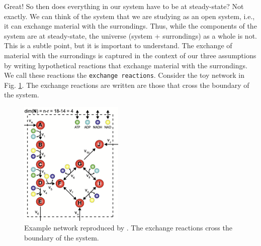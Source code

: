 \documentclass{article}[11pt]
\begin{document}
Great! So then does everything in our system have to be at steady-state? Not exactly. 
We can think of the system that we are studying as an open system, i.e., it can exchange material with the 
surrondings. Thus, while the components of the system are at steady-state, the universe (system + surrondings) 
as a whole is not. This is a subtle point, but it is important to understand. The exchange of material with the
surrondings is captured in the context of our three assumptions by writing hypothetical reactions that 
exchange material with the surrondings. We call these reactions the \texttt{exchange reactions}.
Consider the toy network in Fig. \ref{fig:example-exchange-reactions}.
The exchange reactions are written are those that cross the boundary of the system.

\begin{figure}
   \centering
 \includegraphics[width=0.44\textwidth]{./figs/Fig-ExchangeReactions.png}
 \caption{Example network reproduced by \citep{Bordbar:2014aa}.
 The exchange reactions cross the boundary of the system.}\label{fig:example-exchange-reactions}
\end{figure}
\end{document}
